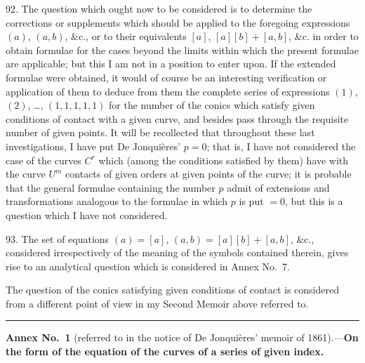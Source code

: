 \documentclass[12pt,a4paper]{article}
\begin{document}
92. The question which ought now to be considered is to determine the corrections or supplements which should be applied to the foregoing expressions $(a)$, $(a, b)$, \&c., or to their equivalents $[a]$, $[a][b] + [a, b]$, \&c. in order to obtain formulae for the cases beyond the limits within which the present formulae are applicable; but this I am not in a position to enter upon. If the extended formulae were obtained, it would of course be an interesting verification or application of them to deduce from them the complete series of expressions $(1)$, $(2)$, \dots, $(1, 1, 1, 1, 1)$ for the number of the conics which satisfy given conditions of contact with a given curve, and besides pass through the requisite number of given points. It will be recollected that throughout these last investigations, I have put De Jonqui\`eres' $p = 0$; that is, I have not considered the case of the curves $C^r$ which (among the conditions satisfied by them) have with the curve $U^m$ contacts of given orders at given points of the curve; it is probable that the general formulae containing the number $p$ admit of extensions and transformations analogous to the formulae in which $p$ is put $= 0$, but this is a question which I have not considered.

93. The set of equations $(a) = [a]$, $(a, b) = [a][b] + [a, b]$, \&c., considered irrespectively of the meaning of the symbols contained therein, gives rise to an analytical question which is considered in Annex No.~7.

The question of the conics satisfying given conditions of contact is considered from a different point of view in my Second Memoir above referred to.

\bigskip
\noindent\rule{\textwidth}{0.4pt}

\bigskip
\noindent\textbf{Annex No.~1} (referred to in the notice of De Jonqui\`eres' memoir of 1861).---\textbf{On the form of the equation of the curves of a series of given index.}

\smallskip
\end{document}
